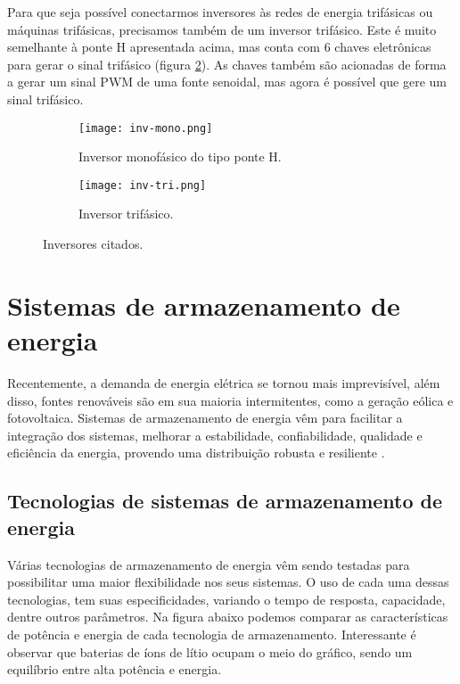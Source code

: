    Para que seja possível conectarmos inversores às redes de energia trifásicas ou máquinas trifásicas, precisamos também de um inversor trifásico. Este é muito semelhante à ponte H apresentada acima, mas conta com 6 chaves eletrônicas para gerar o sinal trifásico (figura \ref{fig:inv-tri}). As chaves também são acionadas de forma a gerar um sinal PWM de uma fonte senoidal, mas agora é possível que gere um sinal trifásico.

   \begin{figure}[!htb]
      \centering
         \begin{subfigure}{0.48\linewidth}
            \texttt{[image: inv-mono.png]}
            \caption{Inversor monofásico do tipo ponte H.}
            \label{fig:inv-mono}
         \end{subfigure}
         \begin{subfigure}{0.48\linewidth}
            \texttt{[image: inv-tri.png]}
            \caption{Inversor trifásico.}
            \label{fig:inv-tri}
         \end{subfigure}
      \caption{Inversores citados.}
      \label{fig:inv-esquematicos}
   \end{figure}


\section{Sistemas de armazenamento de energia}

   Recentemente, a demanda de energia elétrica se tornou mais imprevisível, além disso, fontes renováveis são em sua maioria intermitentes, como a geração eólica e fotovoltaica. Sistemas de armazenamento de energia vêm para facilitar a integração dos sistemas, melhorar a estabilidade, confiabilidade, qualidade e eficiência da energia, provendo uma distribuição robusta e resiliente \cite{Zob18}.

   \subsection{Tecnologias de sistemas de armazenamento de energia}

      Várias tecnologias de armazenamento de energia vêm sendo testadas para possibilitar uma maior flexibilidade nos seus sistemas. O uso de cada uma dessas tecnologias, tem suas especificidades, variando o tempo de resposta, capacidade, dentre outros parâmetros. Na figura abaixo podemos comparar as características de potência e energia de cada tecnologia de armazenamento. Interessante é observar que baterias de íons de lítio ocupam o meio do gráfico, sendo um equilíbrio entre alta potência e energia.

